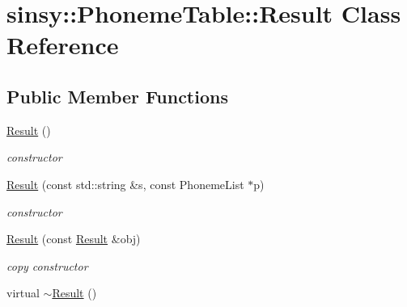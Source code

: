 \hypertarget{classsinsy_1_1PhonemeTable_1_1Result}{\section{sinsy\-:\-:\-Phoneme\-Table\-:\-:\-Result \-Class \-Reference}
\label{classsinsy_1_1PhonemeTable_1_1Result}
}
\subsection*{\-Public \-Member \-Functions}
\begin{DoxyCompactItemize}
\item 
\hypertarget{classsinsy_1_1PhonemeTable_1_1Result_a840c06ed7df049470e45578e76e920ed}{\hyperlink{classsinsy_1_1PhonemeTable_1_1Result_a840c06ed7df049470e45578e76e920ed}{\-Result} ()}\label{classsinsy_1_1PhonemeTable_1_1Result_a840c06ed7df049470e45578e76e920ed}

\begin{DoxyCompactList}\small\item\em constructor \end{DoxyCompactList}\item 
\hypertarget{classsinsy_1_1PhonemeTable_1_1Result_a4c64cb5b6c0a37f0c5226dbffa66066a}{\hyperlink{classsinsy_1_1PhonemeTable_1_1Result_a4c64cb5b6c0a37f0c5226dbffa66066a}{\-Result} (const std\-::string \&s, const \-Phoneme\-List $\ast$p)}\label{classsinsy_1_1PhonemeTable_1_1Result_a4c64cb5b6c0a37f0c5226dbffa66066a}

\begin{DoxyCompactList}\small\item\em constructor \end{DoxyCompactList}\item 
\hypertarget{classsinsy_1_1PhonemeTable_1_1Result_a7ab6f0bd717bb2a846e08b01c3589026}{\hyperlink{classsinsy_1_1PhonemeTable_1_1Result_a7ab6f0bd717bb2a846e08b01c3589026}{\-Result} (const \hyperlink{classsinsy_1_1PhonemeTable_1_1Result}{\-Result} \&obj)}\label{classsinsy_1_1PhonemeTable_1_1Result_a7ab6f0bd717bb2a846e08b01c3589026}

\begin{DoxyCompactList}\small\item\em copy constructor \end{DoxyCompactList}\item 
\hypertarget{classsinsy_1_1PhonemeTable_1_1Result_aee95bde63911f88e982559ffb4d445c2}{virtual \hyperlink{classsinsy_1_1PhonemeTable_1_1Result_aee95bde63911f88e982559ffb4d445c2}{$\sim$\-Result} ()}\label{classsinsy_1_1PhonemeTable_1_1Result_aee95bde63911f88e982559ffb4d445c2}


\end{DoxyCompactItemize}
